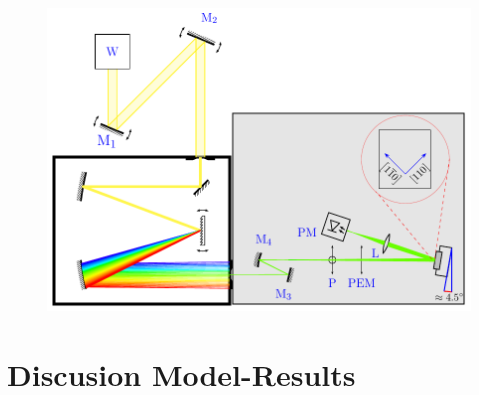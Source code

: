 \begin{figure}[ht!]
	\centering
	\includegraphics[width=\textwidth]{../figures/chapter-3/ras-setup/build/ras-setup-2.pdf}
	\caption{ }
	\label{fig:chapter-3-ras-setup}
\end{figure}



\section{Discusion Model-Results}

























